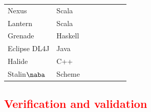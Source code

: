 \documentclass[12pt,initial,twoside,maitrise]{dms}
\newcommand{\cmark}{\textcolor{green!80!black}{\ding{51}}}
\newcommand{\xmark}{\textcolor{red}{\ding{55}}}
\newcommand{\rare}[1]{\textcolor{red}{#1}}
\numberwithin{equation}{section}
\numberwithin{table}{chapter}
\numberwithin{figure}{chapter}
\begin{document}
\begin{center}
\begin{tabular}{llllllll}
Nexus                                    & Scala    & \cmark & \cmark                                                 & \cmark                                                 & \cmark                                         & \cmark                                               & \xmark                                                                \\
Lantern                    & Scala    & \cmark & \cmark                                                 & \cmark                                                 & \xmark                                                          & \cmark                                               & \xmark                                                                \\
Grenade                    & Haskell  & \cmark & \cmark                                                 & \cmark                                                 & \cmark                                         & \xmark                                                                & \xmark                                                                \\
Eclipse DL4J                          & Java     & \cmark & \xmark                                                                  & \cmark                                                 & \xmark                                                          & \xmark                                                                & \xmark                                                                \\
Halide                                    & C++      & \cmark & \xmark                                                                  & \cmark                                                 & \xmark                                                          & \cmark                                               & \xmark                                                                \\
Stalin$\naba$         & Scheme   & \cmark & \cmark & \xmark & \xmark & \xmark & \xmark \\
\end{tabular}
\end{center}

\rare{\chapter{Verification and validation}\label{ch:difftest}}
\end{document}

